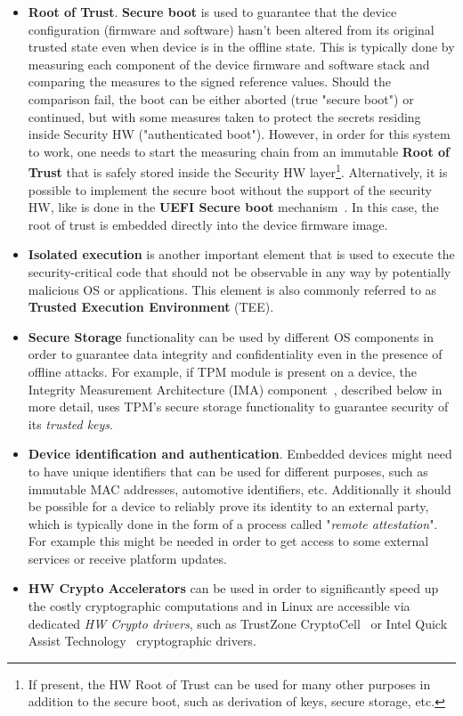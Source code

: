 \begin{itemize}
	\item \textbf{Root of Trust}. \textbf{Secure boot} is used to guarantee that the device configuration (firmware and software) hasn't been altered from its original trusted state even when device is in the offline state. This is typically done by measuring each component of the device firmware and software stack and comparing the measures to the signed reference values. Should the comparison fail, the boot can be either aborted (true "secure boot") or continued, but with some measures taken to protect the secrets residing inside Security HW ("authenticated boot"). However, in order for this system to work, one needs to start the measuring chain from an immutable \textbf{Root of Trust} that is safely stored inside the Security HW layer\footnote{If present, the HW Root of Trust can be used for many other purposes in addition to the secure boot, such as derivation of keys, secure storage, etc.}. Alternatively, it is possible to implement the secure boot without the support of the security HW, like is done in the \textbf{UEFI Secure boot} mechanism~\cite{uefi}. In this case, the root of trust is embedded directly into the device firmware image.
	\item \textbf{Isolated execution} is another important element that is used to execute the security-critical code that should not be observable in any way by potentially malicious OS or applications. This element is also commonly referred to as \textbf{Trusted Execution Environment} (TEE).
	\item \textbf{Secure Storage} functionality can be used by different OS components in order to guarantee data integrity and confidentiality even in the presence of offline attacks. For example, if TPM module is present on a device, the Integrity Measurement Architecture (IMA) component~\cite{ima}, described below in more detail, uses TPM's secure storage functionality to guarantee security of its \textit{trusted keys}.
	\item \textbf{Device identification and authentication}. Embedded devices might need to have unique identifiers that can be used for different purposes, such as immutable MAC addresses, automotive identifiers, etc.  Additionally it should be possible for a device to reliably prove its identity to an external party, which is typically done in the form of a process called "\textit{remote attestation}". For example this might be needed in order to get access to some external services or receive platform updates.
	\item \textbf{HW Crypto Accelerators} can be used in order to significantly speed up the costly cryptographic computations and in Linux are accessible via dedicated \textit{HW Crypto drivers}, such as TrustZone CryptoCell~\cite{cryptocell} or Intel Quick Assist Technology~\cite{intelQAT} cryptographic drivers.
\end{itemize}

